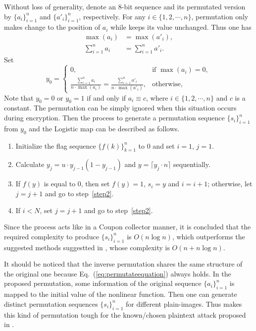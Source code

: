 \documentclass[3p,preprint,11pt]{elsarticle}
\begin{document}
Without loss of generality, denote an $8$-bit sequence and its permutated version by $\{a_i\}_{i=1}^{n}$
and $\{a'_i\}_{i=1}^{n}$, respectively. For any $i\in\{1, 2, \cdots, n\}$, permutation only makes change
to the position of $a_i$ while keeps its value unchanged. Thus one has
\begin{align*}
\max(a_i) &= \max(a'_i), \\
\sum_{i=1}^na_i &= \sum_{i=1}^na'_i.
\end{align*}
Set
\begin{equation}
    y_0 =
    \begin{cases}
    0,                                   & \text{if } \max(a_i)=0,\\
    \frac{\sum_{i=1}^n a_i} {n \cdot \max(a_i)} = \frac{\sum_{i=1}^n a'_i} {n \cdot \max(a'_i)}, & \text{otherwise},
    \end{cases}
\label{eq:permutateequation}
\end{equation}
Note that $y_0 =0$ or $y_0 =1$ if and only if $a_i\equiv c$, where $i \in \{1, 2, \cdots, n\}$ and $c$ is a
constant. The permutation can be simply ignored when this situation occurs during encryption.
Then the process to generate a permutation sequence $\{s_i\}_{i=1}^{n}$ from $y_0$ and the Logistic map can be described as follows.
\begin{enumerate}[{step}  1:]
\item Initialize the flag sequence $\{f(k)\}_{k=1}^n$ to $0$ and set $i=1$, $j=1$.
\item{\label{step2}} Calculate $y_j = u \cdot  y_{j-1}  (1- y_{j-1})$ and $y = \lceil y_j \cdot n \rceil$ sequentially.
\item If $f(y)$ is equal to $0$, then set $f(y)=1$, $s_i=y$ and $i=i+1$; otherwise, let $j=j+1$ and go to step~\ref{step2}.
\item If $i<N$, set $j=j+1$ and go to step~\ref{step2}.
\end{enumerate}
Since the process acts like in a Coupon collector \cite[Sec.~3.6]{Motwani:RandomAlgo:Cambridge95} manner, it is concluded that the required complexity to
produce $\{s_i\}_{i=1}^{n}$ is $O(n \log n)$, which outperforms the suggested methods suggestted in \cite{Fouda:fastblock:CNSNS14}, whose complexity
is $O(n+ n \log n)$.



It should be noticed that the inverse permutation shares the same structure of the original one because Eq.~(\ref{eq:permutateequation}) always holds. In the proposed permutation, some information of the
original sequence $\{a_i\}_{i=1}^{n}$ is mapped to the initial value of the nonlinear function.
Then one can generate distinct permutation sequences $\{s_i\}_{i=1}^{n}$ for different plain-images.
Thus makes this kind of permutation tough for the known/chosen plaintext attack proposed in \cite{Chengqing:OptimalofPermutation:SG11, Shujun:quantitativePermutation:SGIC08}.
\end{document}
